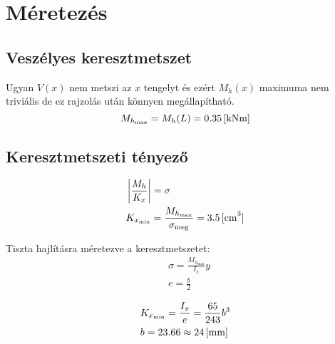 \section{Méretezés}

\subsection{Veszélyes keresztmetszet}
Ugyan $V(x)$ nem metszi az $x$ tengelyt és ezért $M_h(x)$ maximuma nem triviális de ez rajzolás után könnyen megállapítható.
\begin{equation*}
	M_{h_\text{max}} = M_h(L) = \SI{0.35}{[\kilo\newton\meter]}
\end{equation*}

\subsection{Keresztmetszeti tényező}

\begin{align*}
	&\left|\frac{M_h}{K_x}\right| = \sigma \\
	&K_{x_\text{min}} = \frac{M_{h_\text{max}}}{\sigma_\text{meg}} = \siunit{3.5}{\cm^3}
\end{align*}

Tiszta hajlításra méretezve a keresztmetszetet:
\begin{align*}
	&\sigma = \frac{M_{h_\text{max}}}{I_x} y \\
	&e = \frac{b}{2}
\end{align*}

\begin{align*}
	&K_{x_\text{min}} 
	= \frac{I_x}{e} = \frac{65}{243} b^3 \\
	&b = 23.66 \approx \siunit{24}{\mm}
\end{align*}
